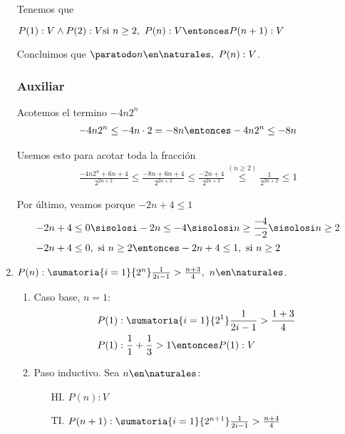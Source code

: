 \begin{enumerate}[label=\roman*)]
        Tenemos que

        $P(1): V \land P(2): V \\
          \text{si } n \geq 2, \ P(n): V \entonces P(n+1): V$

        Concluimos que $\paratodo n \en \naturales, \ P(n): V$.

        \subsubsection*{Auxiliar}
        Acotemos el termino $-4n 2^n$
        \begin{align*}
          -4n 2^n \leq -4n \cdot 2 = -8n \entonces -4n 2^n \leq -8n
        \end{align*}

        Usemos esto para acotar toda la fracción
        \begin{align*}
          \frac{-4n 2^n + 6n + 4}{2^{2n+2}} \leq \frac{-8n + 6n + 4}{2^{2n+2}} \leq \frac{-2n + 4}{2^{2n+2}}
          \overset{(n \geq 2)}{\leq} \frac{1}{2^{2n+2}} \leq 1
        \end{align*}

        Por último, veamos porque $-2n+4 \leq 1$
        \begin{align*}
          -2n + 4 & \leq 0 \sisolosi -2n \leq -4 \sisolosi n \geq \frac{-4}{-2}
          \sisolosi n \geq 2                                                              \\
          -2n + 4 & \leq 0, \text{ si } n \geq 2 \entonces -2n + 4 \leq 1, \text{ si } n \geq 2
        \end{align*}


  \item $P(n):  \sumatoria{i=1}{2^n} \frac{1}{2i-1} > \frac{n+3}{4}, \ n \en \naturales$.
        \begin{enumerate}[label=\arabic*)]
          \item Caso base, $n = 1$:
                \begin{align*}
                  P(1) & : \sumatoria{i=1}{2^1} \frac{1}{2i-1} > \frac{1+3}{4} \\
                  P(1) & : \frac{1}{1} + \frac{1}{3} > 1  \entonces P(1): V
                \end{align*}

          \item Paso inductivo. Sea $n \en \naturales$:
                \begin{enumerate}
                  \item[HI.] $P(n): V$
                  \item[TI.] $P(n+1):  \sumatoria{i=1}{2^{n+1}} \frac{1}{2i-1} > \frac{n+4}{4}$
                \end{enumerate}


\end{enumerate}
\end{enumerate}
